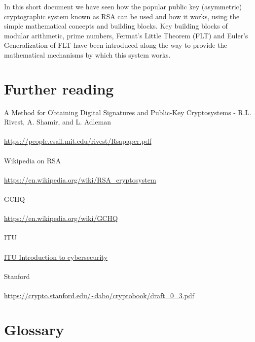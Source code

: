 \documentclass[11pt]{article}   	%
\begin{document}
In this short document we have seen how the popular public key (asymmetric) cryptographic system known as RSA can be used and how it works, using the simple mathematical concepts and building blocks. Key building blocks of modular arithmetic, prime numbers, Fermat's Little Theorem (FLT) and Euler's Generalization of FLT have been introduced along the way to provide the mathematical mechanisms by which this system works.


\break

\section*{Further reading}

A Method for Obtaining Digital Signatures and Public-Key Cryptosystems - R.L. Rivest, A. Shamir, and L. Adleman \\
\\
\url{https://people.csail.mit.edu/rivest/Rsapaper.pdf} \\
\\
Wikipedia on RSA \\
\\
\url{https://en.wikipedia.org/wiki/RSA_cryptosystem} \\
\\
GCHQ \\
\\
\url{https://en.wikipedia.org/wiki/GCHQ} \\
\\
ITU \\
\\
\href{https://www.itu.int/en/ITU-D/Cybersecurity/Documents/01-Introduction%20to%20Cryptography.pdf}{ITU Introduction to cybersecurity} \\
\\
Stanford \\
\\
\url{https://crypto.stanford.edu/~dabo/cryptobook/draft_0_3.pdf}


\break

\section*{Glossary}
\end{document}
